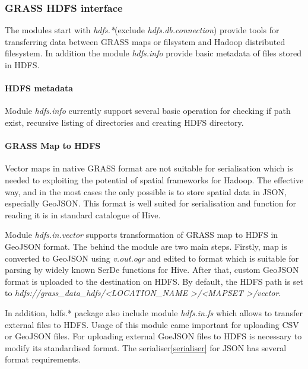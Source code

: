 \documentclass[a4paper,12pt,oneside]{report}
\begin{document}
\subsubsection{GRASS HDFS interface}
The modules start with \textit{hdfs.*}(exclude \textit{hdfs.db.connection}) provide tools for transferring data between GRASS maps or filsystem and Hadoop distributed filesystem. In addition the module \textit{hdfs.info} provide basic metadata of files stored in HDFS.

\paragraph{HDFS metadata} Module \textit{hdfs.info} currently support several basic operation for checking if path exist, recursive listing of directories and creating HDFS directory.


\paragraph{GRASS Map to HDFS} Vector maps in native GRASS format are not suitable for serialisation which is needed to exploiting the potential of spatial frameworks for Hadoop. The effective way, and in the most cases the only possible is to store spatial data in JSON, especially GeoJSON. This format is well suited for serialisation and function for reading it is in standard catalogue of Hive. 

Module \textit{hdfs.in.vector} supports transformation of GRASS map to HDFS in GeoJSON format. The behind the module are two main steps. Firstly, map is converted to GeoJSON using \textit{v.out.ogr} and edited to format which is suitable for parsing by widely known SerDe functions for Hive. After that, custom GeoJSON format is uploaded to the  destination on HDFS. By default, the HDFS path is set to \textit{hdfs://grass\_data\_hdfs/\textless LOCATION\_NAME \textgreater/\textless MAPSET \textgreater /vector}.

In addition, hdfs.* package also include module \textit{hdfs.in.fs} which allows to transfer external files to HDFS. Usage of this module came important for uploading CSV  or GeoJSON files. For uploading external GoeJSON files to HDFS is necessary to modify its standardised format. The serialiser\ref{serialiser}  for JSON has several format requirements. %
\end{document}
